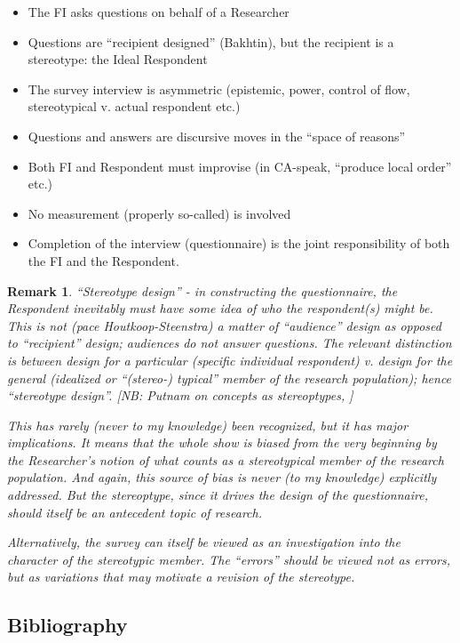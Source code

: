 \documentclass[11pt,twoside]{article}
\newtheorem{remark}{Remark}
\begin{document}
\begin{itemize}
\item The FI asks questions on behalf of a Researcher
\item Questions are ``recipient designed'' (Bakhtin), but the
  recipient is a stereotype: the Ideal Respondent
\item The survey interview is asymmetric (epistemic, power, control of
  flow, stereotypical v. actual respondent etc.)
\item Questions and answers are discursive moves in the ``space of reasons''
\item Both FI and Respondent must improvise (in CA-speak, ``produce local order'' etc.)
\item No measurement (properly so-called) is involved
\item Completion of the interview (questionnaire) is the joint
  responsibility of both the FI and the Respondent.
\end{itemize}

\begin{remark}
  ``Stereotype design'' - in constructing the questionnaire, the
  Respondent inevitably must have some idea of who the respondent(s)
  might be.  This is not (\textit{pace} Houtkoop-Steenstra) a matter
  of ``audience'' design as opposed to ``recipient'' design; audiences
  do not answer questions.  The relevant distinction is between design
  for a particular (specific individual respondent) v. design for the
  general (idealized or ``(stereo-) typical'' member of the research
  population); hence ``stereotype design''.  [NB: Putnam on concepts
    as stereoptypes, \cite{putnam_meaning_1975}]

  This has rarely (never to my knowledge) been recognized, but it has
  major implications.  It means that the whole show is biased from the
  very beginning by the Researcher's notion of what counts as a
  stereotypical member of the research population.  And again, this
  source of bias is never (to my knowledge) explicitly addressed.  But
  the stereoptype, since it drives the design of the questionnaire,
  should itself be an antecedent topic of research.

Alternatively, the survey can itself be viewed as an investigation
into the character of the stereotypic member.  The ``errors'' should
be viewed not as errors, but as variations that may motivate a
revision of the stereotype.

\end{remark}

\clearpage
\appendix
\begin{appendices}
\section{Bibliography}
\end{appendices}
\end{document}
